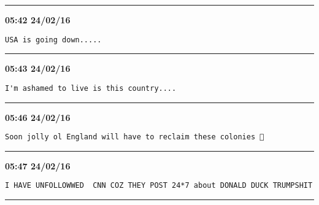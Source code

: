 \hrule%

\begin{adjustwidth}{0cm}{0cm}
\footnotesize \textbf{05:42 24/02/16}

\begin{lstlisting}[breaklines, breakatwhitespace, basicstyle=\small, frame=leftline]
USA is going down.....
\end{lstlisting}
\end{adjustwidth}

\hrule%

\begin{adjustwidth}{0cm}{0cm}
\footnotesize \textbf{05:43 24/02/16}

\begin{lstlisting}[breaklines, breakatwhitespace, basicstyle=\small, frame=leftline]
I'm ashamed to live is this country....
\end{lstlisting}
\end{adjustwidth}

\hrule%

\begin{adjustwidth}{0cm}{0cm}
\footnotesize \textbf{05:46 24/02/16}

\begin{lstlisting}[breaklines, breakatwhitespace, basicstyle=\small, frame=leftline]
Soon jolly ol England will have to reclaim these colonies 💂
\end{lstlisting}
\end{adjustwidth}

\hrule%

\begin{adjustwidth}{0cm}{0cm}
\footnotesize \textbf{05:47 24/02/16}

\begin{lstlisting}[breaklines, breakatwhitespace, basicstyle=\small, frame=leftline]
I HAVE UNFOLLOWWED  CNN COZ THEY POST 24*7 about DONALD DUCK TRUMPSHIT
\end{lstlisting}
\end{adjustwidth}

\hrule%

